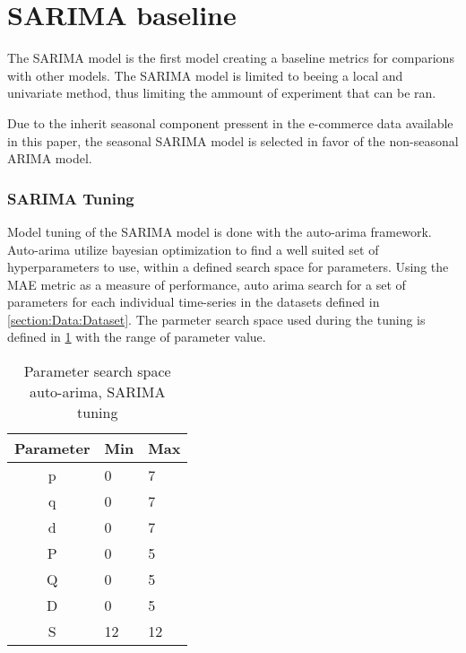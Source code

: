 
\section{SARIMA baseline}
\label{section:Method:SARIMA}

The SARIMA model is the first model creating a baseline metrics for comparions with other models.
The SARIMA model is limited to beeing a local and univariate method,
thus limiting the ammount of experiment that can be ran.

Due to the inherit seasonal component pressent in the e-commerce data available in this paper,
the seasonal SARIMA model is selected in favor of the non-seasonal ARIMA model.

\subsubsection{SARIMA Tuning}
Model tuning of the SARIMA model is done with the auto-arima framework.
Auto-arima utilize bayesian optimization to find a well suited set of hyperparameters to use,
within a defined search space for parameters.
Using the MAE metric as a measure of performance, auto arima search for a set of parameters for each individual time-series
in the datasets defined in \cref{section:Data:Dataset}.
The parmeter search space used during the tuning is defined in \cref{table:method:arima-tuning} with the range of parameter value.

\begin{table}[h]
  \centering
  \caption{Parameter search space auto-arima, SARIMA tuning}
  \label{table:method:arima-tuning}
  \begin{tabular}{|c|l|l|}\hline
    Parameter & Min & Max \\ \hline
    p         & 0   & 7   \\ \hline
    q         & 0   & 7   \\ \hline
    d         & 0   & 7   \\ \hline
    P         & 0   & 5   \\ \hline
    Q         & 0   & 5   \\ \hline
    D         & 0   & 5   \\ \hline
    S         & 12   & 12   \\ \hline
  \end{tabular}
\end{table}









